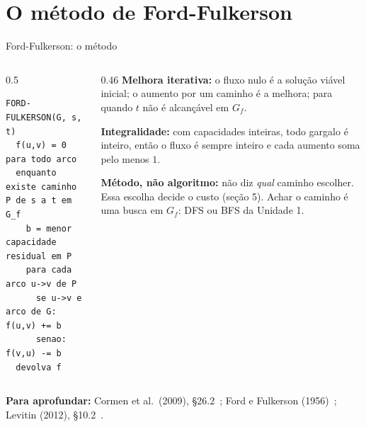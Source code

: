 \documentclass[aspectratio=169,xcolor=table]{beamer}
\newcommand{\fonte}[1]{%
  \vfill
  {\tiny\color{gray!55!black}\textbf{Para aprofundar:} #1\par}%
}
\begin{document}
\section{O método de Ford-Fulkerson}

\begin{frame}[fragile]{Ford-Fulkerson: o método}
  \begin{columns}[c]
    \begin{column}{0.5\textwidth}
\begin{lstlisting}[language={}, basicstyle=\ttfamily\scriptsize]
FORD-FULKERSON(G, s, t)
  f(u,v) = 0 para todo arco
  enquanto existe caminho P de s a t em G_f
    b = menor capacidade residual em P
    para cada arco u->v de P
      se u->v e arco de G: f(u,v) += b
      senao:               f(v,u) -= b
  devolva f
\end{lstlisting}
    \end{column}
    \begin{column}{0.46\textwidth}
      \scriptsize
      \textbf{Melhora iterativa:} o fluxo nulo é a solução viável inicial; o aumento por um
      caminho é a melhora; para quando $t$ não é alcançável em $G_f$.
      \medskip

      \textbf{Integralidade:} com capacidades inteiras, todo gargalo é inteiro, então o
      fluxo é sempre inteiro e cada aumento soma pelo menos $1$.
      \medskip

      \textbf{Método, não algoritmo:} não diz \emph{qual} caminho escolher. Essa escolha
      decide o custo (seção 5). Achar o caminho é uma busca em $G_f$: DFS ou BFS da
      Unidade 1.
    \end{column}
  \end{columns}
  \fonte{Cormen et al.\ (2009), \S 26.2~\cite{cormen2009introduction};
    Ford e Fulkerson (1956)~\cite{ford1956maximal}; Levitin (2012), \S 10.2~\cite{levitin2012introduction}.}
\end{frame}
\end{document}
